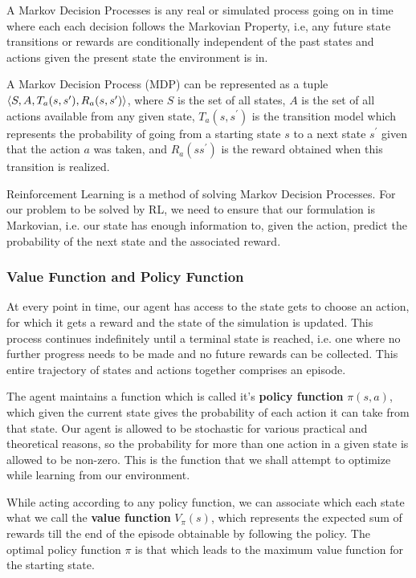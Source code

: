 
A Markov Decision Processes is any real or simulated process going on in time where each each decision follows the Markovian Property, i.e, any future state transitions or rewards are conditionally independent of the past states and actions given the present state the environment is in.

A Markov Decision Process (MDP) can be represented as a tuple $\braket{S, A, T_a(s, s^\prime), R_a(s, s^\prime)}$, where $S$ is the set of all states, $A$ is the set of all actions available from any given state, $T_a(s, s^\prime)$ is the transition model which represents the probability of going from a starting state $s$ to a next state $s^\prime$ given that the action $a$ was taken, and $R_a(s s^\prime)$ is the reward obtained when this transition is realized.

Reinforcement Learning is a method of solving Markov Decision Processes. For our problem to be solved by RL, we need to ensure that our formulation is Markovian, i.e. our state has enough information to, given the action, predict the probability of the next state and the associated reward.

\subsubsection{Value Function and Policy Function}

At every point in time, our agent has access to the state gets to choose an action, for which it gets a reward and the state of the simulation is updated. 
This process continues indefinitely until a terminal state is reached, i.e. one where no further progress needs to be made and no future rewards can be collected. This entire trajectory of states and actions together comprises an episode.

The agent maintains a function which is called it's \textbf{policy function} $\pi(s, a)$, which given the current state gives the probability of each action it can take from that state. Our agent is allowed to be stochastic for various practical and theoretical reasons, so the probability for more than one action in a given state is allowed to be non-zero. This is the function that we shall attempt to optimize while learning from our environment.

While acting according to any policy function, we can associate which each state what we call the \textbf{value function} $V_{\pi}(s)$, which represents the expected sum of rewards till the end of the episode obtainable by following the policy. The optimal policy function $\pi$ is that which leads to the maximum value function for the starting state.

